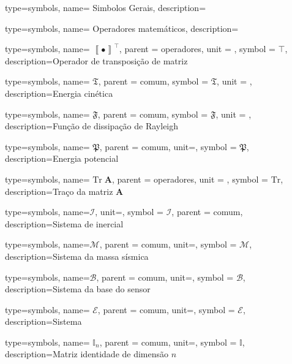{type=symbols,
  name= {Simbolos Gerais},
  description={}
}

{type=symbols,
  name= {Operadores matemáticos},
  description={}
}



{type=symbols,
  name= \ensuremath{\left\llbracket \bullet \right\rrbracket ^{\intercal}},
  parent = {operadores},
  unit = \unexpanded{},
  symbol = \ensuremath{\intercal},
  description={Operador de transposição de matriz}
}

{type=symbols,
  name= \ensuremath{\mathfrak{T}},
  parent = {comum},
  symbol = \ensuremath{\mathfrak{T}},
  unit = \unexpanded{\si{\joule}},
  description={Energia cinética}
}

{type=symbols,
  name= \ensuremath{\mathfrak{F}},
  parent = {comum},
  symbol = \ensuremath{\mathfrak{F}},
  unit = \unexpanded{\si{\joule}},
  description={Função de dissipação de Rayleigh}
}

{type=symbols,
  name= \ensuremath{\mathfrak{P}},
  parent = {comum},
  unit=\unexpanded{\si{\joule}},
  symbol = \ensuremath{\mathfrak{P}},
  description={Energia potencial}
}

{type=symbols,
  name= \ensuremath{\text{Tr}\;\mathbf{A}},
  parent = {operadores},
  unit = \unexpanded{},
  symbol = \ensuremath{\text{Tr}},
  description={Traço da matriz \ensuremath{\mathbf{A}}}
}

{type=symbols,
  name=\ensuremath{\mathcal{I}},
  unit={},
  symbol = \ensuremath{\mathcal{I}},
  parent = comum,
  description={Sistema de inercial}
}

{type=symbols,
  name=\ensuremath{\mathcal{M}},
  parent = comum,
  unit={},
  symbol = \ensuremath{\mathcal{M}},
  description={Sistema da massa sísmica}
}

{type=symbols,
  name=\ensuremath{\mathcal{B}},
  parent = comum,
  unit={},
  symbol = \ensuremath{\mathcal{B}},
  description={Sistema da base do sensor}
}

{type=symbols,
  name= \ensuremath{\mathcal{E}},
  parent = {comum},
  unit={},
  symbol = \ensuremath{\mathcal{E}},
  description={Sistema }
}


{type=symbols,
  name= \ensuremath{\mathbb{I}_{n}},
  parent = comum,
  unit={},
  symbol = \ensuremath{\mathbb{I}},
  description={Matriz identidade de dimensão \ensuremath{n}}
}

